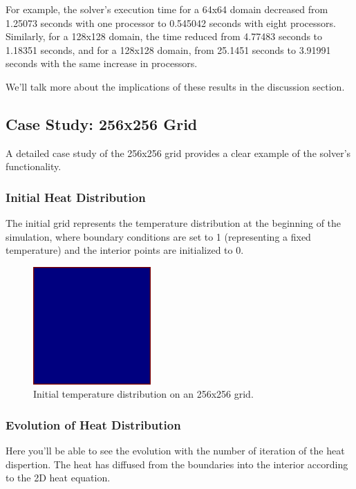 \documentclass[11pt]{article}
\begin{document}
        For example, the solver's execution time for a 64x64 domain decreased from 1.25073 seconds with one processor to 0.545042 seconds with eight processors. Similarly, for a 128x128 domain, the time reduced from 4.77483 seconds to 1.18351 seconds, and for a 128x128 domain, from 25.1451 seconds to 3.91991 seconds with the same increase in processors.

        We'll talk more about the implications of these results in the discussion section.

        \subsection{Case Study: 256x256 Grid}
        A detailed case study of the 256x256 grid provides a clear example of the solver's functionality.

        \subsubsection{Initial Heat Distribution}
    The initial grid represents the temperature distribution at the beginning of the simulation, where boundary conditions are set to 1 (representing a fixed temperature) and the interior points are initialized to 0.

    \begin{figure}[ht]
        \centering
        \includegraphics[width=0.4\textwidth]{img/initial_grid.png}
        \caption{Initial temperature distribution on an 256x256 grid.}
        \label{fig:initial_grid}
    \end{figure}

    \subsubsection{Evolution of Heat Distribution}
    Here you'll be able to see the evolution with the number of iteration of the heat dispertion. The heat has diffused from the boundaries into the interior according to the 2D heat equation.
\end{document}
